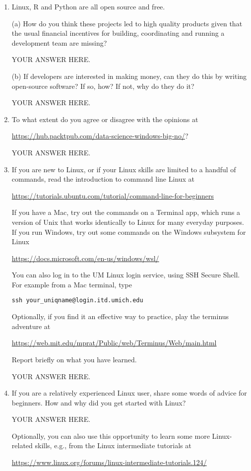 \documentclass[12pt]{article}
\begin{document}
\begin{enumerate}

\item Linux, R and Python are all open source and free. 

(a) How do you think these projects led to high quality products given that the  usual financial incentives for building, coordinating and running a development team are missing?

YOUR ANSWER HERE.

(b) If developers are interested in making money, can they do this by writing open-source software? If so, how? If not, why do they do it?

YOUR ANSWER HERE.
  
\item To what extent do you agree or disagree with the opinions at

\url{https://hub.packtpub.com/data-science-windows-big-no/}? 

YOUR ANSWER HERE.

\item If you are new to Linux, or if your Linux skills are limited to a handful of commands, read the introduction to command line Linux at
  
\url{https://tutorials.ubuntu.com/tutorial/command-line-for-beginners}

If you have a Mac, try out the commands on a Terminal app, which runs a version of Unix that works identically to Linux for many everyday purposes. If you run Windows, try out some commands on the Windows subsystem for Linux

\url{https://docs.microsoft.com/en-us/windows/wsl/}

You can also log in to the UM Linux login service, using SSH Secure Shell. For example from a Mac terminal, type

\texttt{ssh your\_uniqname@login.itd.umich.edu}

Optionally, if you find it an effective way to practice, play the terminus adventure at

\url{https://web.mit.edu/mprat/Public/web/Terminus/Web/main.html}

Report briefly on what you have learned.

YOUR ANSWER HERE.

\item If you are a relatively experienced Linux user, share some words of advice for beginners. How and why did you get started with Linux?  

YOUR ANSWER HERE.

Optionally, you can also use this opportunity to learn some more Linux-related skills, e.g., from the Linux intermediate tutorials at

\url{https://www.linux.org/forums/linux-intermediate-tutorials.124/}


\end{enumerate}
\end{document}
